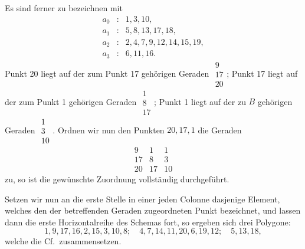 \documentclass[11pt]{article}
\newcommand{\Cf}{\textup{Cf.}}
\begin{document}
Es sind ferner zu bezeichnen mit
\[
\begin{array}{rcl}
 a_0&:&1,3,10,\\
 a_1&:&5,8,13,17,18,\\
 a_2&:&2,4,7,9,12,14,15,19,\\
 a_3&:&6,11,16.
\end{array}
\]
Punkt 20 liegt auf der zum Punkt 17 gehörigen Geraden $\begin{array}{c}9\\17\\20\end{array}$; Punkt 17 liegt auf der zum Punkt 1 gehörigen Geraden $\begin{array}{c}1\\8\\17\end{array}$; Punkt 1 liegt auf der zu $B$ gehörigen Geraden $\begin{array}{c}1\\3\\10\end{array}$.
Ordnen wir nun den Punkten $20,17,1$ die Geraden
\[
\begin{array}{ccc}
9&1&1\\
17&8&3\\
20&17&10
\end{array}
\]
zu, so ist die gewünschte Zuordnung vollständig durchgeführt.

Setzen wir nun an die erste Stelle in einer jeden Colonne dasjenige Element, welches den der betreffenden Geraden zugeordneten Punkt bezeichnet, und lassen dann die erste Horizontalreihe des Schemas fort, so ergeben sich drei Polygone:
\[
1,9,17,16,2,15,3,10,8;\quad 4,7,14,11,20,6,19,12;\quad 5,13,18,
\]
welche die \Cf\ zusammensetzen.
\end{document}
